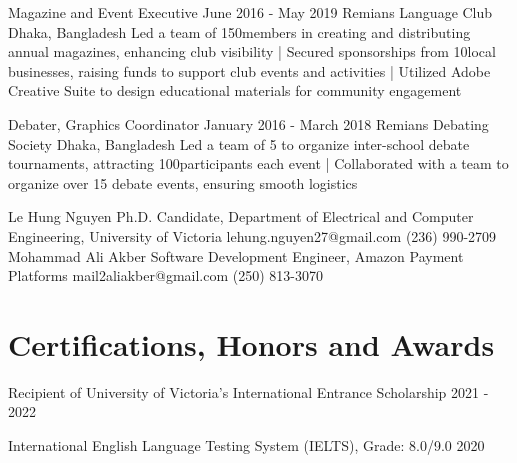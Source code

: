 \documentclass[a4paper,10pt]{article}
\begin{document}
\relevantexperience
{Magazine and Event Executive}
{June 2016 - May 2019}
{Remians Language Club}
{Dhaka, Bangladesh}
{Led a team of 150\plus members in creating and distributing annual magazines, enhancing club visibility
| Secured sponsorships from 10\plus local businesses, raising funds to support club events and activities 
| Utilized Adobe Creative Suite to design educational materials for community engagement
}

\relevantexperience
{Debater, Graphics Coordinator}
{January 2016 - March 2018}
{Remians Debating Society}
{Dhaka, Bangladesh}
{Led a team of 5 to organize inter-school debate tournaments, attracting 100\plus participants each event
| Collaborated with a team to organize over 15 debate events, ensuring smooth logistics 
}

\begin{references}
        {Le Hung Nguyen}
        {Ph.D. Candidate, Department of Electrical and}
        {Computer Engineering, University of Victoria}
        {lehung.nguyen27@gmail.com}
        {(236) 990-2709}
    \hfill
        {Mohammad Ali Akber}
        {Software Development Engineer,}
        {Amazon Payment Platforms}
        {mail2aliakber@gmail.com}
        {(250) 813-3070}
\end{references}

\section{Certifications, Honors and Awards}
\honorsawards
{Recipient of University of Victoria’s International Entrance Scholarship}
{2021 - 2022}

\honorsawards
{International English Language Testing System (IELTS), Grade: 8.0/9.0}
{2020}
\end{document}
